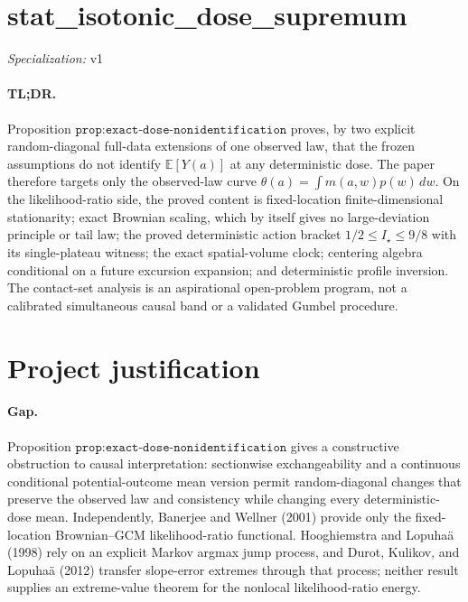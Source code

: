 \documentclass{article}
\begin{document}
\sloppy

\section*{stat\_\allowbreak{}isotonic\_\allowbreak{}dose\_\allowbreak{}supremum}

\noindent\textit{Specialization:} v1\par

\paragraph{TL;DR.} Proposition \(\texttt{prop:exact-dose-nonidentification}\) proves, by two explicit random-diagonal full-data extensions of one observed law, that the frozen assumptions do not identify \(\mathbb E[Y(a)]\) at any deterministic dose. The paper therefore targets only the observed-law curve \(\theta(a)=\int m(a,w)p(w)\,dw\). On the likelihood-ratio side, the proved content is fixed-location finite-dimensional stationarity; exact Brownian scaling, which by itself gives no large-deviation principle or tail law; the proved deterministic action bracket \(1/2\le I_\star\le9/8\) with its single-plateau witness; the exact spatial-volume clock; centering algebra conditional on a future excursion expansion; and deterministic profile inversion. The contact-set analysis is an aspirational open-problem program, not a calibrated simultaneous causal band or a validated Gumbel procedure.

\section{Project justification}

\paragraph{Gap.} Proposition \(\texttt{prop:exact-dose-nonidentification}\) gives a constructive obstruction to causal interpretation: sectionwise exchangeability and a continuous conditional potential-outcome mean version permit random-diagonal changes that preserve the observed law and consistency while changing every deterministic-dose mean. Independently, Banerjee and Wellner (2001) provide only the fixed-location Brownian--GCM likelihood-ratio functional. Hooghiemstra and Lopuhaä (1998) rely on an explicit Markov argmax jump process, and Durot, Kulikov, and Lopuhaä (2012) transfer slope-error extremes through that process; neither result supplies an extreme-value theorem for the nonlocal likelihood-ratio energy.
\end{document}
